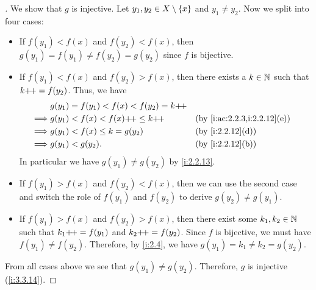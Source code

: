 \begin{proof}[]
  We show that \(g\) is injective.
  Let \(y_1, y_2 \in X \setminus \left\lbrace x\right\rbrace\) and \(y_1 \neq y_2\).
  Now we split into four cases:
  \begin{itemize}
    \item If \(f(y_1) < f(x)\) and \(f(y_2) < f(x)\), then \(g(y_1) = f(y_1) \neq f(y_2) = g(y_2)\) since \(f\) is bijective.
    \item If \(f(y_1) < f(x)\) and \(f(y_2) > f(x)\), then there exists a \(k \in \mathbb{N}\) such that \(k{+}\!{+} = f(y_2)\).
          Thus, we have
          \begin{align*}
                     & g(y_1) = f(y_1) < f(x) < f(y_2) = k\pp                                  \\
            \implies & g(y_1) < f(x) < f(x)\pp \leq k\pp      &  & \by{i:ac:2.2.3,i:2.2.12}[e] \\
            \implies & g(y_1) < f(x) \leq k = g(y_2)          &  & \by{i:2.2.12}[d]            \\
            \implies & g(y_1) < g(y_2).                       &  & \by{i:2.2.12}[b]
          \end{align*}
          In particular we have \(g(y_1) \neq g(y_2)\) by \cref{i:2.2.13}.
    \item If \(f(y_1) > f(x)\) and \(f(y_2) < f(x)\), then we can use the second case and switch the role of \(f(y_1)\) and \(f(y_2)\) to derive \(g(y_2) \neq g(y_1)\).
    \item If \(f(y_1) > f(x)\) and \(f(y_2) > f(x)\), then there exist some \(k_1, k_2 \in \mathbb{N}\) such that \(k_1{+}\!{+} = f(y_1)\) and \(k_2{+}\!{+} = f(y_2)\).
          Since \(f\) is bijective, we must have \(f(y_1) \neq f(y_2)\).
          Therefore, by \cref{i:2.4}, we have \(g(y_1) = k_1 \neq k_2 = g(y_2)\).
  \end{itemize}
  From all cases above we see that \(g(y_1) \neq g(y_2)\).
  Therefore, \(g\) is injective (\cref{i:3.3.14}).


\end{proof}
